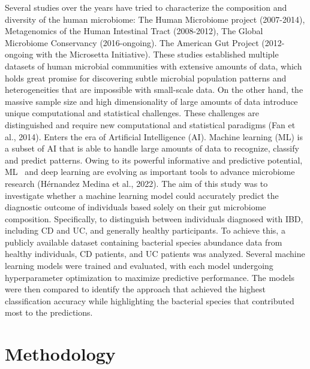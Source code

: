 \documentclass[twoside,twocolumn,10pt]{article}
\begin{document}
Several studies over the years have tried to characterize the composition and diversity of the human microbiome: The Human Microbiome project (2007-2014), Metagenomics of the Human Intestinal Tract (2008-2012), The Global Microbiome Conservancy (2016-ongoing). The American Gut Project (2012-ongoing with the Microsetta Initiative). These studies established multiple datasets of human microbial communities with extensive amounts of data, which holds great promise for discovering subtle microbial population patterns and heterogeneities that are impossible with small-scale data. On the other hand, the massive sample size and high dimensionality of large amounts of data introduce unique computational and statistical challenges. These challenges are distinguished and require new computational and statistical paradigms (Fan et al., 2014). Enters the era of Artificial Intelligence (AI). Machine learning (ML) is a subset of AI that is able to handle large amounts of data to recognize, classify and predict patterns. Owing to its powerful informative and predictive potential, ML  and deep learning are evolving as important tools to advance microbiome research (Hérnandez Medina et al., 2022). The aim of this study was to investigate whether a machine learning model could accurately predict the diagnostic outcome of individuals based solely on their gut microbiome composition. Specifically, to distinguish between individuals diagnosed with IBD, including CD and UC, and generally healthy participants. To achieve this, a publicly available dataset containing bacterial species abundance data from healthy individuals, CD patients, and UC patients was analyzed. Several machine learning models were trained and evaluated, with each model undergoing hyperparameter optimization to maximize predictive performance. The models were then compared to identify the approach that achieved the highest classification accuracy while highlighting the bacterial species that contributed most to the predictions.


\section{Methodology}
\fontsize{11}{13}\selectfont
\end{document}

